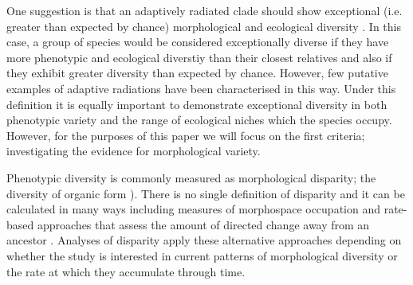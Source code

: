 \documentclass[12pt,a4paper]{article}
\begin{document}

One suggestion is that an adaptively radiated clade should show exceptional (i.e. greater than expected by chance) morphological and ecological diversity \citep{Losos2010a}. In this case, a group of species would be considered exceptionally diverse if they have more phenotypic and ecological diverstiy than their closest relatives and also if they exhibit greater diversity than expected by chance. However, few putative examples of adaptive radiations have been characterised in this way. %
Under this definition it is equally important to demonstrate exceptional diversity in both phenotypic variety and the range of ecological niches which the species occupy. However, for the purposes of this paper we will focus on the first criteria; investigating the evidence for morphological variety. 


Phenotypic diversity is commonly measured as morphological disparity; the diversity of organic form \citep{Foote1997,Erwin2007}). There is no single definition of disparity and it can be calculated in many ways including measures of morphospace occupation \citep[e.g.][]{Goswami2011, Brusatte2008} and rate-based approaches that assess the amount of directed change away from an ancestor \citep{OMeara2006, Price2013}. Analyses of disparity apply these alternative approaches depending on whether the study is interested in current patterns of morphological diversity or the rate at which they accumulate through time. 



\end{document}
